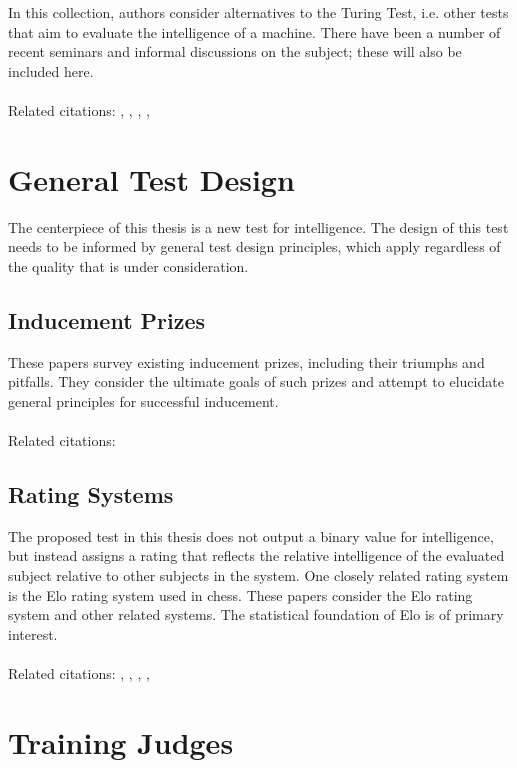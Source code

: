 \documentclass{article} %
\begin{document}
In this collection, authors consider alternatives to the Turing Test, i.e. other tests that aim to evaluate the intelligence of a machine. There have been a number of recent seminars and informal discussions on the subject; these will also be included here.
\\
\\ Related citations: \cite{riedl2014lovelace}, \cite{marcus2014comes}, \cite{levesque2012winograd}, \cite{levesque2009enough}, \cite{cohen2005if}

\section{General Test Design}

The centerpiece of this thesis is a new test for intelligence. The design of this test needs to be informed by general test design principles, which apply regardless of the quality that is under consideration.

\subsection{Inducement Prizes}

These papers survey existing inducement prizes, including their triumphs and pitfalls. They consider the ultimate goals of such prizes and attempt to elucidate general principles for successful inducement.
\\
\\ Related citations: \cite{schroeder2004application}

\subsection{Rating Systems}

The proposed test in this thesis does not output a binary value for intelligence, but instead assigns a rating that reflects the relative intelligence of the evaluated subject relative to other subjects in the system. One closely related rating system is the Elo rating system used in chess. These papers consider the Elo rating system and other related systems. The statistical foundation of Elo is of primary interest.
\\
\\ Related citations: \cite{keener1993perron}, \cite{hastie1998classification}, \cite{glickman1999rating}, \cite{bradley1952rank}, \cite{elo1978rating}

\section{Training Judges}
\end{document}
